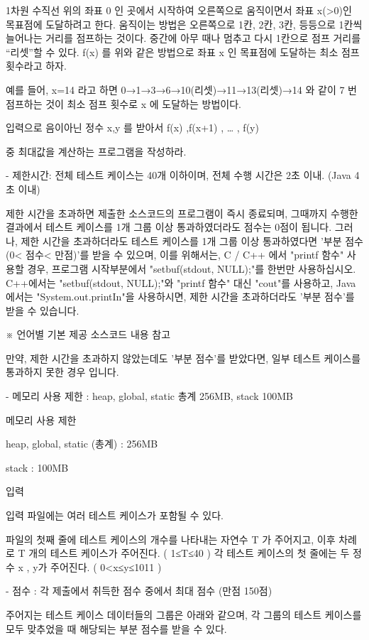 \documentclass [12pt] {oblivoir}
\begin{document}
1차원 수직선 위의 좌표 0 인 곳에서 시작하여 오른쪽으로 움직이면서 좌표 x(>0)인 목표점에 도달하려고 한다.
움직이는 방법은 오른쪽으로 1칸, 2칸, 3칸, 등등으로 1칸씩 늘어나는 거리를 점프하는 것이다.
중간에 아무 때나 멈추고 다시 1칸으로 점프 거리를 “리셋”할 수 있다.
f(x) 를 위와 같은 방법으로 좌표  x 인 목표점에 도달하는 최소 점프 횟수라고 하자.

예를 들어, x=14 라고 하면 0→1→3→6→10(리셋)→11→13(리셋)→14 와 같이 7 번 점프하는 것이 최소 점프 횟수로 x 에 도달하는 방법이다.

입력으로 음이아닌 정수 x,y 를 받아서 f(x)  ,f(x+1) , … , f(y)

중 최대값을 계산하는 프로그램을 작성하라.

- 제한시간: 전체 테스트 케이스는 40개 이하이며, 전체 수행 시간은 2초 이내. (Java 4초 이내)

제한 시간을 초과하면 제출한 소스코드의 프로그램이 즉시 종료되며, 그때까지 수행한 결과에서 테스트 케이스를 1개 그룹 이상 통과하였더라도 점수는 0점이 됩니다.
그러나, 제한 시간을 초과하더라도 테스트 케이스를 1개 그룹 이상 통과하였다면 '부분 점수(0< 점수< 만점)'를 받을 수 있으며,
이를 위해서는, C / C++ 에서 "printf 함수" 사용할 경우, 프로그램 시작부분에서 "setbuf(stdout, NULL);"를 한번만 사용하십시오.
C++에서는 "setbuf(stdout, NULL);"와 "printf 함수" 대신 "cout"를 사용하고, Java에서는 "System.out.printIn"을 사용하시면,
제한 시간을 초과하더라도 '부분 점수'를 받을 수 있습니다.

※ 언어별 기본 제공 소스코드 내용 참고

만약, 제한 시간을 초과하지 않았는데도 '부분 점수'를 받았다면, 일부 테스트 케이스를 통과하지 못한 경우 입니다.

- 메모리 사용 제한 : heap, global, static 총계 256MB, stack 100MB

메모리 사용 제한

heap, global, static (총계) : 256MB

stack : 100MB

입력

입력 파일에는 여러 테스트 케이스가 포함될 수 있다.

파일의 첫째 줄에 테스트 케이스의 개수를 나타내는 자연수 T
가 주어지고,
이후 차례로  T 개의 테스트 케이스가 주어진다. ( 1≤T≤40 )
각 테스트 케이스의 첫 줄에는 두 정수 x , y가 주어진다. ( 0<x≤y≤1011 )

- 점수 : 각 제출에서 취득한 점수 중에서 최대 점수 (만점 150점)

주어지는 테스트 케이스 데이터들의 그룹은 아래와 같으며,
각 그룹의 테스트 케이스를 모두 맞추었을 때 해당되는 부분 점수를 받을 수 있다.
\end{document}
